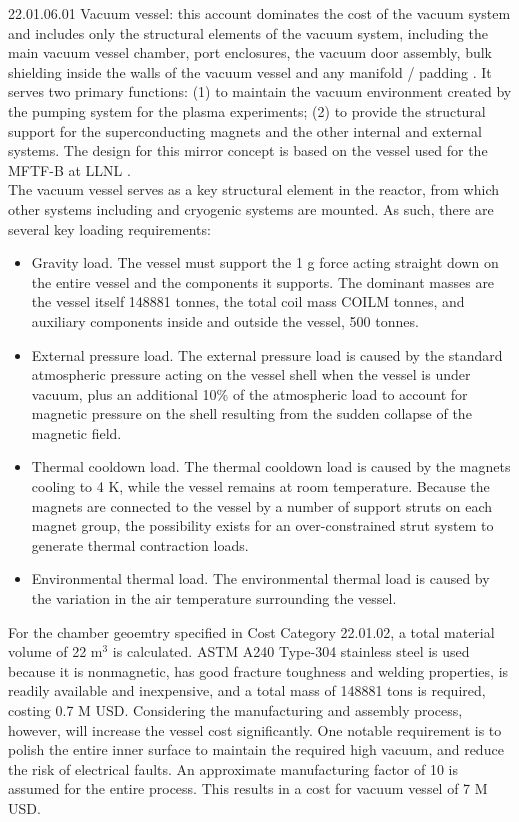 22.01.06.01 Vacuum vessel: this account dominates the cost of the vacuum system and includes only the structural elements of the vacuum system, including the main vacuum vessel chamber, port enclosures, the vacuum door assembly, bulk shielding inside the walls of the vacuum vessel and any manifold / padding \cite{waganer2006design}. It serves two primary functions: (1) to maintain the vacuum environment created by the pumping system for the plasma experiments; (2) to provide the structural support for the superconducting magnets and the other internal and external systems. The design for this mirror concept is based on the vessel used for the MFTF-B at LLNL \cite{gerich1986design}. \\

The vacuum vessel serves as a  key structural element in the reactor, from which other systems including and cryogenic systems are mounted.  As such, there are several key loading requirements:

\begin{itemize}
    \item Gravity load. The vessel must support the 1 g force acting straight down on the entire vessel and the components it supports. The dominant masses are the vessel itself 148881 tonnes, the total coil mass COILM tonnes, and auxiliary components inside and outside the vessel, 500 tonnes.

    \item External pressure load. The external pressure load is caused by the standard atmospheric pressure acting on the vessel shell when the vessel is under vacuum, plus an additional 10\% of the atmospheric load to account for magnetic  pressure on the shell resulting from the sudden collapse of the magnetic field. 

    \item Thermal cooldown load. The thermal cooldown load is  caused by the magnets cooling to 4 K, while the vessel remains at room temperature. Because the magnets are connected to the vessel by a number of support struts on each  magnet group, the possibility exists for an over-constrained  strut system to generate thermal contraction loads.

    \item Environmental thermal load. The environmental thermal load is caused by the variation in the air temperature surrounding the vessel.

\end{itemize}

For the chamber geoemtry specified in Cost Category 22.01.02, a total material volume of 22 m$^3$ is calculated. ASTM A240 Type-304 stainless steel is used because it is nonmagnetic, has good fracture toughness and welding properties, is readily available and inexpensive, and a total mass of 148881 tons is required, costing 0.7 M USD. Considering the manufacturing and assembly process, however, will increase the vessel cost significantly. One notable requirement is to polish the entire inner surface to maintain the required high vacuum, and reduce the risk of electrical faults. An approximate manufacturing factor of 10 is assumed for the entire process. This results in a cost for vacuum vessel of 7 M USD.\\

